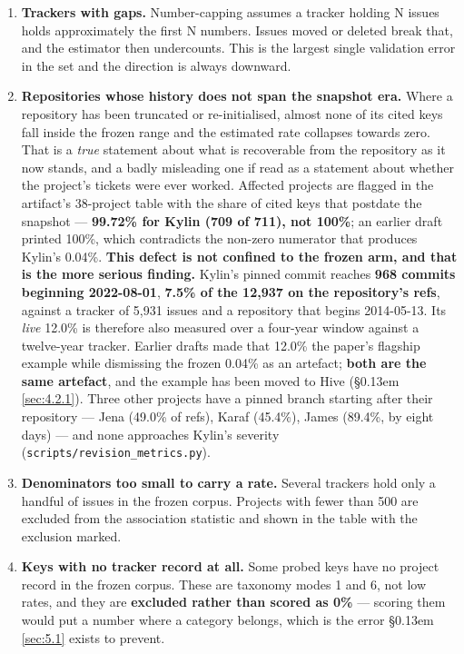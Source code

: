 \documentclass[sigconf,review,anonymous]{acmart}
\begin{document}
\begin{enumerate}
\item \textbf{Trackers with gaps.} Number-capping assumes a tracker holding N issues holds approximately the first N numbers. Issues moved or deleted break that, and the estimator then undercounts. This is the largest single validation error in the set and the direction is always downward.
\item \textbf{Repositories whose history does not span the snapshot era.} Where a repository has been truncated or re-initialised, almost none of its cited keys fall inside the frozen range and the estimated rate collapses towards zero. That is a \emph{true} statement about what is recoverable from the repository as it now stands, and a badly misleading one if read as a statement about whether the project's tickets were ever worked. Affected projects are flagged in the artifact's 38-project table with the share of cited keys that postdate the snapshot --- \textbf{99.72\% for Kylin (709 of 711), not 100\%}; an earlier draft printed 100\%, which contradicts the non-zero numerator that produces Kylin's 0.04\%.
\textbf{This defect is not confined to the frozen arm, and that is the more serious finding.} Kylin's pinned commit reaches \textbf{968 commits beginning 2022-08-01}, \textbf{7.5\% of the 12,937 on the repository's refs}, against a tracker of 5,931 issues and a repository that begins 2014-05-13. Its \emph{live} 12.0\% is therefore also measured over a four-year window against a twelve-year tracker. Earlier drafts made that 12.0\% the paper's flagship example while dismissing the frozen 0.04\% as an artefact; \textbf{both are the same artefact}, and the example has been moved to Hive (\S\kern0.13em \ref{sec:4.2.1}). Three other projects have a pinned branch starting after their repository --- Jena (49.0\% of refs), Karaf (45.4\%), James (89.4\%, by eight days) --- and none approaches Kylin's severity (\texttt{scripts/\allowbreak{}revision\_\allowbreak{}metrics.\allowbreak{}py}).

\item \textbf{Denominators too small to carry a rate.} Several trackers hold only a handful of issues in the frozen corpus. Projects with fewer than 500 are excluded from the association statistic and shown in the table with the exclusion marked.
\item \textbf{Keys with no tracker record at all.} Some probed keys have no project record in the frozen corpus. These are taxonomy modes 1 and 6, not low rates, and they are \textbf{excluded rather than scored as 0\%} --- scoring them would put a number where a category belongs, which is the error \S\kern0.13em \ref{sec:5.1} exists to prevent.
\end{enumerate}
\end{document}
